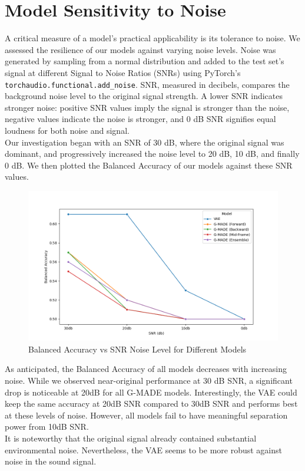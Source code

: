 \section{Model Sensitivity to Noise}
A critical measure of a model's practical applicability is its tolerance to noise. We assessed the resilience of our models against varying noise levels. Noise was generated by sampling from a normal distribution and added to the test set's signal at different Signal to Noise Ratios (SNRs) using PyTorch's \lstinline{torchaudio.functional.add_noise}. SNR, measured in decibels, compares the background noise level to the original signal strength. A lower SNR indicates stronger noise: positive SNR values imply the signal is stronger than the noise, negative values indicate the noise is stronger, and 0 dB SNR signifies equal loudness for both noise and signal.\\
Our investigation began with an SNR of 30 dB, where the original signal was dominant, and progressively increased the noise level to 20 dB, 10 dB, and finally 0 dB. We then plotted the Balanced Accuracy of our models against these SNR values.
\begin{figure}[h!]
    \includegraphics[width=\linewidth]{images/snr_balacc}
    \caption{
    Balanced Accuracy vs SNR Noise Level for Different Models
}
\end{figure}

As anticipated, the Balanced Accuracy of all models decreases with increasing noise. While we observed near-original performance at 30 dB SNR, a significant drop is noticeable at 20dB for all G-MADE models. Interestingly, the VAE could keep the same accuracy at 20dB SNR compared to 30dB SNR and performs best at these levels of noise. However, all models fail to have meaningful separation power from 10dB SNR.\\
It is noteworthy that the original signal already contained substantial environmental noise. Nevertheless, the VAE seems to be more robust against noise in the sound signal.
